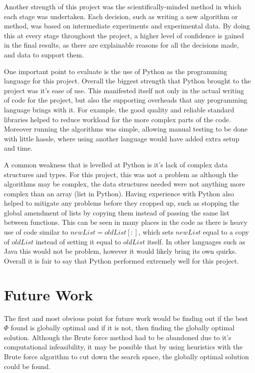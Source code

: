\documentclass[12pt]{report}
\begin{document}
Another strength of this project was the scientifically-minded method in which each stage was undertaken. Each decision, such as writing a new algorithm or method, was based on intermediate experiments and experimental data. By doing this at every stage throughout the project, a higher level of confidence is gained in the final results, as there are explainable reasons for all the decisions made, and data to support them.

One important point to evaluate is the use of Python as the programming language for this project. Overall the biggest strength that Python brought to the project was it's ease of use. This manifested itself not only in the actual writing of code for the project, but also the supporting overheads that any programming language brings with it. For example, the good quality and reliable standard libraries helped to reduce workload for the more complex parts of the code. Moreover running the algorithms was simple, allowing manual testing to be done with little hassle, where using another language would have added extra setup and time. 

A common weakness that is levelled at Python is it's lack of complex data structures and types. For this project, this was not a problem as although the algorithms may be complex, the data structures needed were not anything more complex than an array (list in Python). Having experience with Python also helped to mitigate any problems before they cropped up, such as stopping the global amendment of lists by copying them instead of passing the same list between functions. This can be seen in many places in the code as there is heavy use of code similar to $newList = oldList[:]$, which sets $newList$ equal to a copy of $oldList$ instead of setting it equal to $oldList$ itself. In other languages such as Java this would not be problem, however it would likely bring its own quirks. Overall it is fair to say that Python performed extremely well for this project.

\section{Future Work}\label{FutureWork}
The first and most obvious point for future work would be finding out if the best $\Phi$ found is globally optimal and if it is not, then finding the globally optimal solution. Although the Brute force method had to be abandoned due to it's computational infeasibility, it may be possible that by using heuristics with the Brute force algorithm to cut down the search space, the globally optimal solution could be found.
\end{document}
